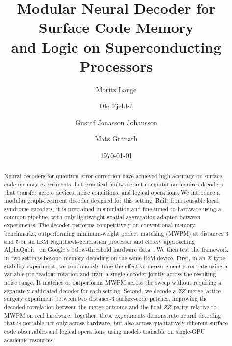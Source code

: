 \documentclass[aps,prxquantum,twocolumn,superscriptaddress,nofootinbib]{revtex4-2}
\begin{document}
\title{Modular Neural Decoder for Surface Code Memory\\ and Logic on Superconducting Processors}

\author{Moritz Lange}
\author{Ole Fjeldså}
\author{Gustaf Jonasson Johansson}
\author{Mats Granath}

\date{\today}

\begin{abstract}

Neural decoders for quantum error correction have achieved high accuracy on surface code memory experiments, but practical fault-tolerant computation requires decoders that transfer across devices, noise conditions, and logical operations. We introduce a modular graph-recurrent decoder designed for this setting. Built from reusable local syndrome encoders, it is pretrained in simulation and fine-tuned to hardware using a common pipeline, with only lightweight spatial aggregation adapted between experiments. The decoder performs competitively on conventional memory benchmarks, outperforming minimum-weight perfect matching (MWPM) at distances 3 and 5 on an IBM Nighthawk-generation processor and closely approaching AlphaQubit~\cite{bausch2024alphaqubit} on Google's below-threshold hardware data~\cite{google2024threshold}. We then test the framework in two settings beyond memory decoding on the same IBM device. First, in an $X$-type stability experiment, we continuously tune the effective measurement error rate using a variable pre-readout rotation and train a single decoder jointly across the resulting noise range. It matches or outperforms MWPM across the sweep without requiring a separately calibrated decoder for each setting. Second, we decode a $ZZ$-merge lattice-surgery experiment between two distance-3 surface-code patches, improving the decoded correlation between the merge outcome and the final $ZZ$ parity relative to MWPM on real hardware. Together, these experiments demonstrate neural decoding that is portable not only across hardware, but also across qualitatively different surface code observables and logical operations, using models trainable on single-GPU academic resources.

\end{abstract}
\end{document}
